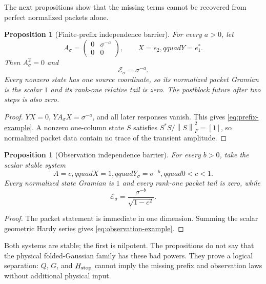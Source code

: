 \documentclass[11pt]{article}
\newtheorem{proposition}[theorem]{Proposition}
\theoremstyle{definition}
\theoremstyle{remark}
\newcommand{\norm}[1]{\left\lVert#1\right\rVert}
\begin{document}
The next propositions show that the missing terms cannot be recovered from
perfect normalized packets alone.

\begin{proposition}[Finite-prefix independence barrier]
\label{prop:prefix-barrier}
For every $a>0$, let
\[
 A_\sigma=
 \begin{pmatrix}0&\sigma^{-a}\\0&0\end{pmatrix},
 \qquad X=e_2,qquad Y=e_1^*.
\]
Then $A_\sigma^2=0$ and
\begin{equation}
 \mathcal E_\sigma=\sigma^{-a}.
 \label{eq:prefix-example}
\end{equation}
Every nonzero state has one source coordinate, so its normalized packet
Gramian is the scalar $1$ and its rank-one relative tail is zero.  The
postblock future after two steps is also zero.
\end{proposition}

\begin{proof}
$YX=0$, $YA_\sigma X=\sigma^{-a}$, and all later responses vanish.  This
gives \eqref{eq:prefix-example}.  A nonzero one-column state $S$ satisfies
$S^*S/\norm S_F^2=[1]$, so normalized packet data contain no trace of the
transient amplitude.
\end{proof}

\begin{proposition}[Observation independence barrier]
\label{prop:observation-barrier}
For every $b>0$, take the scalar stable system
\[
 A=c,qquad X=1,qquad Y_\sigma=\sigma^{-b},qquad 0<c<1.
\]
Every normalized state Gramian is $1$ and every rank-one packet tail is zero,
while
\begin{equation}
 \mathcal E_\sigma
 =\frac{\sigma^{-b}}{\sqrt{1-c^2}}.
 \label{eq:observation-example}
\end{equation}
\end{proposition}

\begin{proof}
The packet statement is immediate in one dimension.  Summing the scalar
geometric Hardy series gives \eqref{eq:observation-example}.
\end{proof}

Both systems are stable; the first is nilpotent.  The propositions do not say
that the physical folded-Gaussian family has these bad powers.  They prove a
logical separation: $Q$, $G$, and $H_{\rm stop}$ cannot imply the missing
prefix and observation laws without additional physical input.
\end{document}
